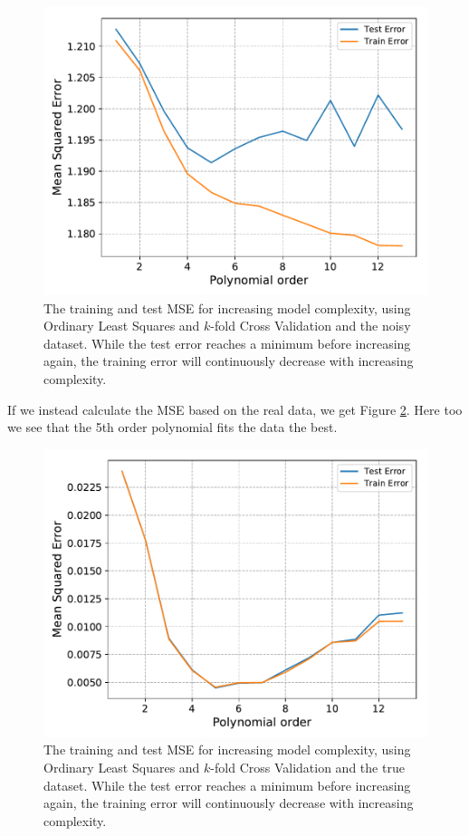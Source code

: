\documentclass[a4paper,10pt,english]{article}
\begin{document}
 \begin{figure}[H]
 	\centering
 	\includegraphics[scale=0.6]{c_OLSerr_train_test_vs_pdegree.pdf}
 	\caption{The training and test MSE for increasing model complexity, using Ordinary Least Squares and $k$-fold Cross Validation and the noisy dataset. While the test error reaches a minimum before increasing again, the training error will continuously decrease with increasing complexity.}
 	\label{fig:2}
 \end{figure}

If we instead calculate the MSE based on the real data, we get Figure \ref{fig:2b}. Here too we see that the 5th order polynomial fits the data the best.
 \begin{figure}[H]
	\centering
	\includegraphics[scale=0.6]{c_OLSerr_train_test_vs_pdegree_no_noise.pdf}
	\caption{The training and test MSE for increasing model complexity, using Ordinary Least Squares and $k$-fold Cross Validation and the true dataset. While the test error reaches a minimum before increasing again, the training error will continuously decrease with increasing complexity.}
	\label{fig:2b}
\end{figure}
\end{document}
